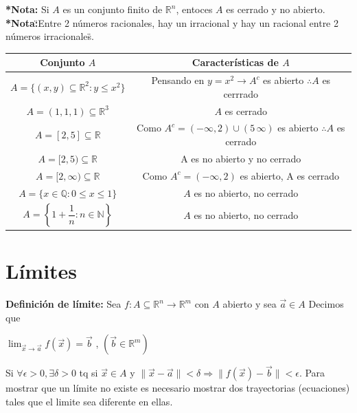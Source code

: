 \documentclass[12pt]{article}
\begin{document}
\noindent\textbf{*Nota: }Si $A$ es un conjunto finito de $\mathbb{R}^n$, entoces $A$ es cerrado y no abierto.\newline
\noindent\textbf{*Nota:}\"{}Entre 2 números racionales, hay un irracional y hay un racional entre 2 números irracionales\"{}.\newline
\begin{center}
    \begin{tabular}{| c | c |}
    \hline
    Conjunto $A$ & Características de $A$ \\
    \hline
    $A=\{(x,y)\subseteq\mathbb{R}^2:y\leq x^2\}$ & Pensando en $y=x^2\rightarrow A^c$ es abierto $\therefore A$ es cerrrado  \\
    $A={(1,1,1)}\subseteq\mathbb{R}^3$ & $A$ es cerrado  \\
    $A=[2,5]\subseteq\mathbb{R}$ & Como $A^c=(-\infty,2)\cup(5\,\infty)$ es abierto $\therefore A$ es cerrado  \\
    $A=[2,5)\subseteq\mathbb{R}$ & A  es no abierto y no cerrado   \\
    $A=[2,\infty)\subseteq\mathbb{R}$ & Como $A^c=(-\infty,2)$ es abierto, A es cerrado  \\
    $A=\{x\in\mathbb{Q} : 0\leq x \leq 1\}$ & $A$ es no abierto, no cerrado\\
    $A=\left\{1+\dfrac{1}{n}:n\in\mathbb{N}\right\}$ & $A$ es no abierto, no cerrado \\
    \hline
    \end{tabular}
    \end{center}
\newpage
\section*{Límites}
\noindent\textbf{Definición de límite:} Sea $f:A\subseteq\mathbb{R}^n\rightarrow\mathbb{R}^m$ con $A$ abierto y 
sea $\vec{a}\in A$\newline
Decimos que
\begin{center}
    $\lim_{\vec{x}\rightarrow\vec{a}}{f(\vec{x})} = \vec{b}$ , $(\vec{b}\in\mathbb{R}^m)$ 
\end{center}
\noindent Si $\forall \epsilon>0, \exists \delta >0 $ tq si $\vec{x}\in A$ y $\|\vec{x}-\vec{a}\| < \delta \Rightarrow  \|f(\vec{x})-\vec{b}\| < \epsilon$.\newline
Para mostrar que un límite no existe es necesario mostrar dos trayectorias (ecuaciones) tales que el limite sea diferente en ellas.
\end{document}
